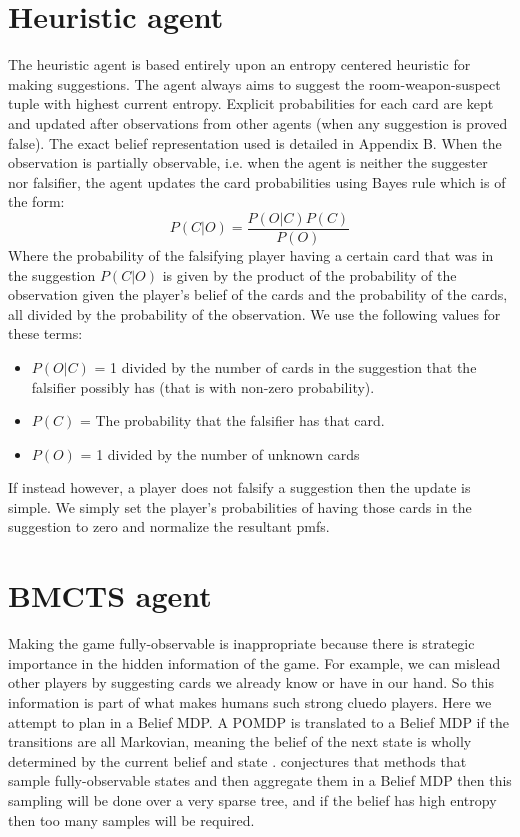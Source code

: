 \documentclass[msc, deptreport, ai, romanprepages]{infthesis}
\begin{document}
\section{Heuristic agent}
The heuristic agent is based entirely upon an entropy centered heuristic for making suggestions. The agent always aims to suggest the room-weapon-suspect tuple with highest current entropy. Explicit probabilities for each card are kept and updated after observations from other agents (when any suggestion is proved false). The exact belief representation used is detailed in Appendix B. When the observation is partially observable, i.e. when the agent is neither the suggester nor falsifier, the agent updates the card probabilities using Bayes rule which is of the form:
\begin{equation}
P(C|O) = \frac{P(O|C) P(C)}{P(O)}
\end{equation}
Where the probability of the falsifying player having a certain card that was in the suggestion \(P(C|O)\) is given by the product of the probability of the observation given the player’s belief of the cards and the probability of the cards, all divided by the probability of the observation. We use the following values for these terms:
\begin{itemize}
\item \(P(O|C)\) = 1 divided by the number of cards in the suggestion that the falsifier possibly has (that is with non-zero probability).
\item \(P(C)\) = The probability that the falsifier has that card.
\item \(P(O)\) = 1 divided by the number of unknown cards
\end{itemize}
If instead however, a player does not falsify a suggestion then the update is simple. We simply set the player’s probabilities of having those cards in the suggestion to zero and normalize the resultant pmfs.

\section{BMCTS agent}
Making the game fully-observable is inappropriate because there is strategic importance in the hidden information of the game. For example, we can mislead other players by suggesting cards we already know or have in our hand. So this information is part of what makes humans such strong cluedo players. Here we attempt to plan in a Belief MDP. A POMDP is translated to a Belief MDP if the transitions are all Markovian, meaning the belief of the next state is wholly determined by the current belief and state \cite{Mihai}. \cite{Mihai} conjectures that methods that sample fully-observable states and then aggregate them in a Belief MDP then this sampling will be done over a very sparse tree, and if the belief has high entropy then too many samples will be required. 
\end{document}
